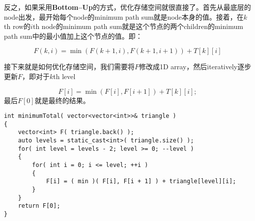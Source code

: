 反之，如果采用\textbf{Bottom--Up}的方式，优化存储空间就很直接了。首先从最底层的node出发，最开始每个node的minimum path sum就是node本身的值。接着，在$k$th row的$i$th node的minimum path sum就是这个节点的两个children的minimum path sum中的最小值加上这个节点的值。即：

\[
F(k,i)=\min(F(k+1, i), F(k+1, i+1)) + T[k][i]
\]

接下来就是如何优化存储空间，我们需要将$F$修改成1D array，然后iteratively逐步更新$F$，即对于$k$th level

\[
F[i] = \min(F[i], F[i+1]) + T[k][i];
\]
最后$F[0]$就是最终的结果。

\setcounter{lstlisting}{0}
\begin{lstlisting}[style=customc, caption={DP}]
int minimumTotal( vector<vector<int>>& triangle )
{
    vector<int> F( triangle.back() );
    auto levels = static_cast<int>( triangle.size() );
    for( int level = levels - 2; level >= 0; --level )
    {
        for( int i = 0; i <= level; ++i )
        {
            F[i] = ( min )( F[i], F[i + 1] ) + triangle[level][i];
        }
    }
    return F[0];
}
\end{lstlisting}
